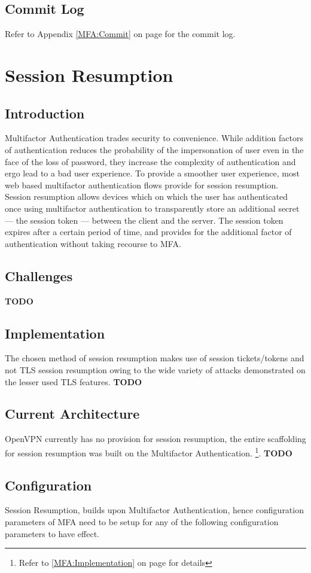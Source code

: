 \documentclass[11pt,oneside]{book}
\newcommand{\mychapter}[2]{
    \setcounter{chapter}{#1}
    \setcounter{section}{0}
    \chapter*{#2}
    \addcontentsline{toc}{chapter}{#2}
}
\begin{document}
\section{Commit Log}
Refer to Appendix \ref{MFA:Commit} on page \pageref{MFA:Commit} for the commit log.

\mychapter{3}{Session Resumption}
\section{Introduction}
Multifactor Authentication trades security to convenience. While addition factors of authentication
reduces the probability of the impersonation of user even in the face of the loss of password,
they increase the complexity of authentication and ergo lead to a bad user experience.
To provide a smoother user experience, most web based multifactor authentication
flows provide for session resumption. Session resumption allows devices which on which the user has authenticated
once using multifactor authentication to transparently store an additional secret --- the session
token --- between the client and the server. The session token expires after a certain period of
time, and provides for the additional factor of authentication without taking recourse to MFA.

\section{Challenges}
\textbf{TODO}

\section{Implementation}
The chosen method of session resumption makes use of session tickets/tokens and not TLS session
resumption owing to the wide variety of attacks\cite{TLS_Insecure} demonstrated on the lesser used TLS features.
\textbf{TODO}

\section{Current Architecture}
OpenVPN currently has no provision for session resumption, the entire scaffolding for session
resumption was built on the Multifactor Authentication. \footnote{ Refer to \ref{MFA:Implementation}
on page \pageref{MFA:Implementation} for details}.
\textbf{TODO}

\section{Configuration}
Session Resumption, builds upon Multifactor Authentication, hence configuration parameters of MFA
need to be setup for any of the following configuration parameters to have effect.
\end{document}
